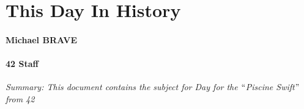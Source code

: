 \documentclass[12pt]{report}
\begin{document}
\vspace{\baselineskip}

\vspace{\baselineskip}

\vspace{\baselineskip}

\vspace{\baselineskip}

\vspace{\baselineskip}
\par

\section*{This Day In History}

\vspace{\baselineskip}

\vspace{\baselineskip}
\paragraph*{Michael BRAVE }
\paragraph*{42 Staff }

\vspace{\baselineskip}

\vspace{\baselineskip}

\vspace{\baselineskip}

\vspace{\baselineskip}
\begin{Center}
\textit{Summary: This document contains the subject for Day for the $``$Piscine Swift$"$  from 42}
\end{Center}\par


\vspace{\baselineskip}

\vspace{\baselineskip}

\vspace{\baselineskip}

\vspace{\baselineskip}
\end{document}
